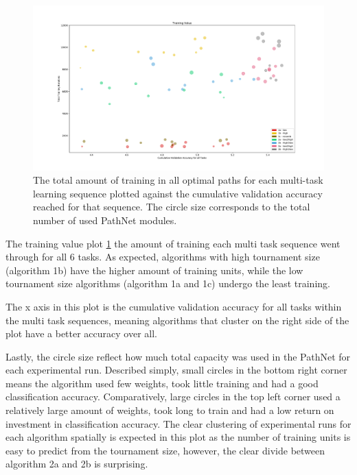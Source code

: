 \begin{figure}[p!]%
    \includegraphics[width=\textwidth]{Chapters/Experiments/search_algo/figures/Training_value.pdf}
    \caption{The total amount of training in all optimal paths for each multi-task learning sequence plotted against the cumulative validation accuracy reached for that sequence. The circle size corresponds to the total number of used PathNet modules.}
    \label{fig:search.training_value}
\end{figure}

The training value plot \ref{fig:search.training_value} the amount of training each multi task sequence went through for all 6 tasks. As expected, algorithms with high tournament size (algorithm 1b) have the higher amount of training units, while the low tournament size algorithms (algorithm 1a and 1c) undergo the least training.

The x axis in this plot is the cumulative validation accuracy for all tasks within the multi task sequences, meaning algorithms that cluster on the right side of the plot have a better accuracy over all. 

Lastly, the circle size reflect how much total capacity was used in the PathNet for each experimental run. Described simply, small circles in the bottom right corner means the algorithm used few weights, took little training and had a good classification accuracy. Comparatively, large circles in the top left corner used a relatively large amount of weights, took long to train and had a low return on investment in classification accuracy. The clear clustering of experimental runs for each algorithm spatially is expected in this plot as the number of training units is easy to predict from the tournament size, however, the clear divide between algorithm 2a and 2b is surprising.

